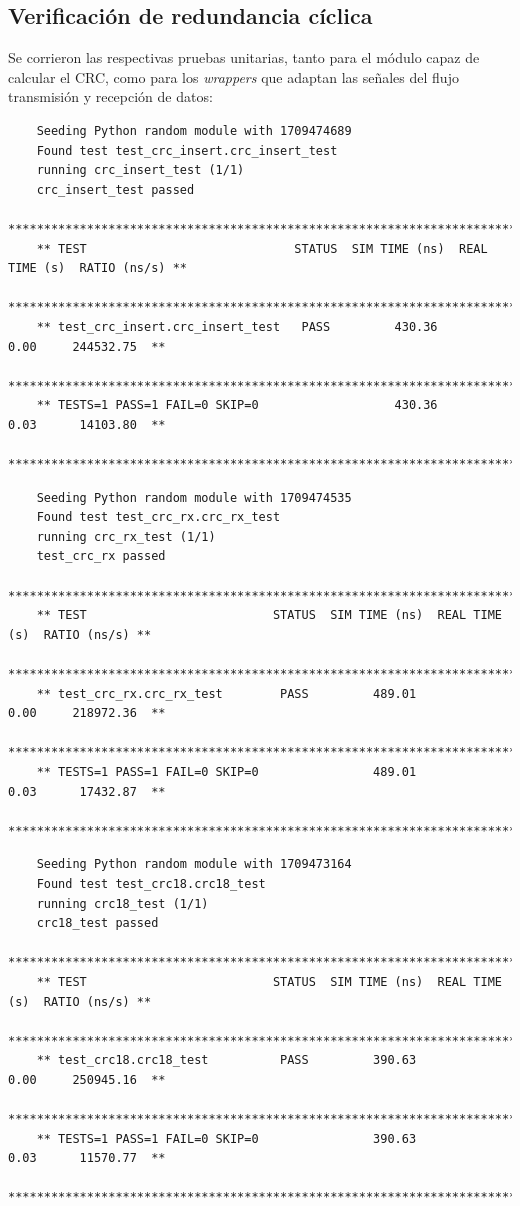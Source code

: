 \subsection{Verificación de redundancia cíclica}

  Se corrieron las respectivas pruebas unitarias, tanto para el módulo capaz de
  calcular el CRC, como para los \textit{wrappers} que adaptan las señales del
  flujo transmisión y recepción de datos:

  {\scriptsize\begin{verbatim}
    Seeding Python random module with 1709474689
    Found test test_crc_insert.crc_insert_test
    running crc_insert_test (1/1)
    crc_insert_test passed
    *****************************************************************************************
    ** TEST                             STATUS  SIM TIME (ns)  REAL TIME (s)  RATIO (ns/s) **
    *****************************************************************************************
    ** test_crc_insert.crc_insert_test   PASS         430.36           0.00     244532.75  **
    *****************************************************************************************
    ** TESTS=1 PASS=1 FAIL=0 SKIP=0                   430.36           0.03      14103.80  **
    *****************************************************************************************
  \end{verbatim}}

  {\scriptsize\begin{verbatim}
    Seeding Python random module with 1709474535
    Found test test_crc_rx.crc_rx_test
    running crc_rx_test (1/1)
    test_crc_rx passed
    **************************************************************************************
    ** TEST                          STATUS  SIM TIME (ns)  REAL TIME (s)  RATIO (ns/s) **
    **************************************************************************************
    ** test_crc_rx.crc_rx_test        PASS         489.01           0.00     218972.36  **
    **************************************************************************************
    ** TESTS=1 PASS=1 FAIL=0 SKIP=0                489.01           0.03      17432.87  **
    **************************************************************************************
  \end{verbatim}}

  {\scriptsize\begin{verbatim}
    Seeding Python random module with 1709473164
    Found test test_crc18.crc18_test
    running crc18_test (1/1)
    crc18_test passed
    **************************************************************************************
    ** TEST                          STATUS  SIM TIME (ns)  REAL TIME (s)  RATIO (ns/s) **
    **************************************************************************************
    ** test_crc18.crc18_test          PASS         390.63           0.00     250945.16  **
    **************************************************************************************
    ** TESTS=1 PASS=1 FAIL=0 SKIP=0                390.63           0.03      11570.77  **
    **************************************************************************************
  \end{verbatim}}

